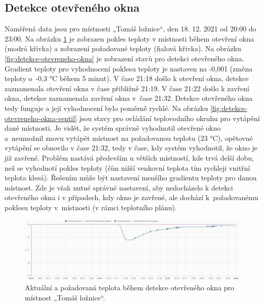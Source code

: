 \subsection{Detekce otevřeného okna}
Naměřená data jsou pro místnosti „Tomáš ložnice“, den 18. 12. 2021 od 20:00 do 23:00. Na obrázku \ref{fig:detekce-otevreneho-okna-aktualni-pozadovana-teplota} je zobrazen pokles teploty v místnosti během otevření okna (modrá křivka) a zobrazení požadované teploty (fialová křivka). Na obrázku \ref{fig:detekce-otevreneho-okna} je zobrazení stavů pro detekci otevřeného okna. Gradient teploty pro vyhodnocení poklesu teploty je nastaven na -0,001 (změna teploty o~-0,3 °C během 5 minut). V čase 21:18 došlo k otevření okna, detekce zaznamenala otevření okna v čase přibližně 21:19. V čase 21:22 došlo k zavření okna, detekce zaznamenala zavření okna v~čase 21:32. Detekce otevřeného okna tedy funguje a její vyhodnocení bylo poměrně rychlé. Na obrázku \ref{fig:detekce-otevreneho-okna-ventil} jsou stavy pro ovládání teplovodního okruhu pro vytápění dané místnosti. Je vidět, že systém správně vyhodnotil otevřené okno a~neumožnil znovu vytápět místnost na požadovanou teplotu (23 °C), opětovné vytápění se obnovilo v čase 21:32, tedy v čase, kdy systém vyhodnotil, že okno je již zavřené. Problém nastává především u větších místností, kde trvá delší dobu, než se vyhodnotí pokles teploty (čím nižší venkovní teplota tím rychleji vnitřní teplota klesá). Řešením může být nastavení menšího gradientu teploty pro danou místnost. Zde je však nutné správné nastavení, aby nedocházelo k detekci otevřeného okna i v případech, kdy okno je zavřené, ale dochází k~požadovanému poklesu teploty v~místnosti (v rámci teplotního plánu).

\begin{figure}[H]
    \centering
    \includegraphics[width=\textwidth]{images/testovani/detekce-otevreneho-okna/detekce-otevreneho-okna-aktualni-pozadovana-teplota.png}
    \caption{Aktuální a požadovaná teplota během detekce otevřeného okna pro místnost „Tomáš ložnice“.}
    \label{fig:detekce-otevreneho-okna-aktualni-pozadovana-teplota}
\end{figure}

